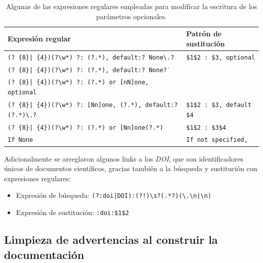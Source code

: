 \begin{table}[H]
    \centering
    \begin{adjustbox}{max width=\textwidth}
    \begin{tabular}{l|l}
        Expresión regular & Patrón de sustitución \\
        \hline
        \texttt{(? \{8\}| \{4\})(?\textbackslash{}w*) ?: (?.*), default:? None\textbackslash{}.?} & \texttt{\$1\$2 : \$3, optional} \\
        \texttt{(? \{8\}| \{4\})(?\textbackslash{}w*) ?: (?.*), default:? None\.?} & \\
        \texttt{(? \{8\}| \{4\})(?\textbackslash{}w*) ?: (?.*) or {[}nN{]}one, optional} & \\
        \hline
        \texttt{(? \{8\}| \{4\})(?\textbackslash{}w*) ?: {[}Nn{]}one, (?.*), default:? (?.*)\textbackslash{}.?} & \texttt{\$1\$2 : \$3, default \$4} \\
        \hline
        \texttt{(? \{8\}| \{4\})(?\textbackslash{}w*) ?: (?.*) or {[}Nn{]}one(?.*)} & \texttt{\$1\$2 : \$3\$4} \\
        \hline
        \texttt{If None} & \texttt{If not specified,} \\
    \end{tabular}
    \end{adjustbox}
    \caption{Algunas de las expresiones regulares empleadas para modificar la escritura de los parámetros opcionales.}
    \label{tab:expresiones_regulares_default_none}
\end{table}

Adicionalmente se arreglaron algunos links a los \textit{DOI}, que son identificadores únicos de documentos científicos, gracias también a la búsqueda y sustitución con expresiones regulares:

\begin{itemize}
    \item Expresión de búsqueda: \texttt{(?:doi|DOI):(?!\textasciigrave{})\textbackslash s?(.*?)(\textbackslash .\textbackslash n|\textbackslash n)}
\end{itemize}
\begin{itemize}
    \item Expresión de sustitución: \texttt{:doi:\textasciigrave{}\$1\textasciigrave{}\$2}
\end{itemize}

\subsection{Limpieza de advertencias al construir la documentación}

